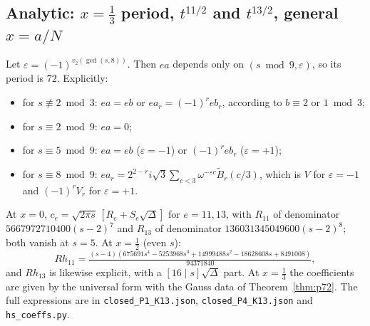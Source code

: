 \subsection{Analytic: $x=\tfrac13$ period, $t^{11/2}$ and $t^{13/2}$, general $x=a/N$}\label{sec:rev6an}
\begin{theorem}[Period $72$ at $x=\tfrac13$ \src{34}, \S1]\label{thm:p72}
Let $\varepsilon=(-1)^{v_2(\gcd(s,8))}$. Then $ea$ depends only on $(s\bmod9,\varepsilon)$, so its period is $72$. Explicitly:
\begin{itemize}[leftmargin=2em]
\item for $s\not\equiv2\bmod3$: $ea=eb$ or $ea_r=(-1)^reb_r$, according to $b\equiv2$ or $1\bmod3$;
\item for $s\equiv2\bmod9$: $ea=0$;
\item for $s\equiv5\bmod9$: $ea=eb$ ($\varepsilon=-1$) or $(-1)^reb_r$ ($\varepsilon=+1$);
\item for $s\equiv8\bmod9$: $ea_r=2^{2-r}i\sqrt3\sum_{c<3}\omega^{-\varepsilon c}\tilde B_r(c/3)$, which is $V$ for $\varepsilon=-1$ and $(-1)^rV_r$ for $\varepsilon=+1$.
\end{itemize}
\end{theorem}
\begin{proposition}[$t^{11/2}$, $t^{13/2}$ \src{34}, \S2]\label{prop:t1113}
At $x=0$, $c_e=\sqrt{2\pi s}\,[R_e+S_e\sqrt\Delta]$ for $e=11,13$, with $R_{11}$ of denominator $5667972710400(s-2)^7$ and $R_{13}$ of denominator $136031345049600(s-2)^8$; both vanish at $s=5$. At $x=\tfrac12$ (even $s$):
\[Rh_{11}=\tfrac{(s-4)(675691s^4-5253968s^3+14999488s^2-18628608s+8491008)}{94371840},\]
and $Rh_{13}$ is likewise explicit, with a $[16\mid s]\sqrt\Delta$ part. At $x=\tfrac13$ the coefficients are given by the universal form with the Gauss data of Theorem~\ref{thm:p72}. The full expressions are in \texttt{closed\_P1\_K13.json}, \texttt{closed\_P4\_K13.json} and \texttt{hs\_coeffs.py}.
\end{proposition}
